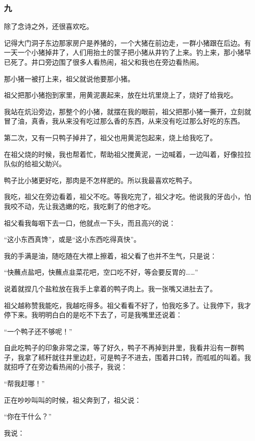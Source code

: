 \subsubsection*{九}
\par 除了念诗之外，还很喜欢吃。
\par 记得大门洞子东边那家房户是养猪的，一个大猪在前边走，一群小猪跟在后边。有一天一个小猪掉井了，人们用抬土的筐子把小猪从井钓了上来。钓上来，那小猪早已死了。井口旁边围了很多人看热闹，祖父和我也在旁边看热闹。
\par 那小猪一被打上来，祖父就说他要那小猪。
\par 祖父把那小猪抱到家里，用黄泥裹起来，放在灶坑里烧上了，烧好了给我吃。
\par 我站在炕沿旁边，那整个的小猪，就摆在我的眼前，祖父把那小猪一撕开，立刻就冒了油，真香，我从来没有吃过那么香的东西，从来没有吃过那么好吃的东西。
\par 第二次，又有一只鸭子掉井了，祖父也用黄泥包起来，烧上给我吃了。
\par 在祖父烧的时候，我也帮着忙，帮助祖父搅黄泥，一边喊着，一边叫着，好像拉拉队似的给祖父助兴。
\par 鸭子比小猪更好吃，那肉是不怎样肥的。所以我最喜欢吃鸭子。
\par 我吃，祖父在旁边看着，祖父不吃。等我吃完了，祖父才吃。他说我的牙齿小，怕我咬不动，先让我选嫩的吃，我吃剩了的他才吃。
\par 祖父看我每咽下去一口，他就点一下头，而且高兴的说：
\par “这小东西真馋”，或是“这小东西吃得真快”。
\par 我的手满是油，随吃随在大襟上擦着，祖父看了也并不生气，只是说：
\par “快蘸点盐吧，快蘸点韭菜花吧，空口吃不好，等会要反胃的……”
\par 说着就捏几个盐粒放在我手上拿着的鸭子肉上。我一张嘴又进肚去了。
\par 祖父越称赞我能吃，我越吃得多。祖父看看不好了，怕我吃多了。让我停下，我才停下来。我明明白白的是吃不下去了，可是我嘴里还说着：
\par “一个鸭子还不够呢！”
\par 自此吃鸭子的印象非常之深，等了好久，鸭子不再掉到井里，我看井沿有一群鸭子，我拿了秫秆就往井里边赶，可是鸭子不进去，围着井口转，而呱呱的叫着。我就招呼了在旁边看热闹的小孩子，我说：
\par “帮我赶哪！”
\par 正在吵吵叫叫的时候，祖父奔到了，祖父说：
\par “你在干什么？”
\par 我说：
